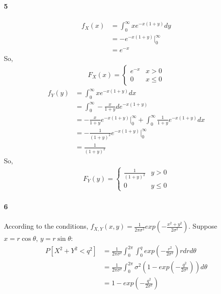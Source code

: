 \documentclass[22pt]{article}
\begin{document}
    \paragraph{5}
    \begin{align}
    f_X(x) & = \int_{0}^{\infty} xe^{-x(1+y)}dy\\
    &  = -e^{-x(1+y)}|_0^{\infty}\\
    & = e^{-x}
    \end{align}
    So,\begin{align}
    F_X(x) = 
				\begin{cases}
				e^{-x} & x >0 \\
				0 & x \leq 0 
				\end{cases}
	\end{align}
    \begin{align}
    f_Y(y) & = \int_{0}^{\infty} xe^{-x(1+y)}dx\\
    & = \int_{0}^{\infty} -\frac{x}{1+y} de^{-x(1+y)}\\
    & = -\frac{x}{1+y} e^{-x(1+y)}|_0^{\infty} + \int_{0}^{\infty}\frac{1}{1+y} e^{-x(1+y)} dx\\
    & = -\frac{1}{(1+y)^2}e^{-x(1+y)}|_0^{\infty} \\
    & = \frac{1}{(1+y)^2}
    \end{align}
    So,\begin{align}
    F_Y(y) = 
				\begin{cases}
				\frac{1}{(1+y)^2} & y > 0\\
				0 & y \leq 0
				\end{cases}
	\end{align}


    \paragraph{6}
    According to the conditions, $f_{X,Y}(x,y) = \frac{1}{2 \pi	\sigma^2}exp(-\frac{x^2+y^2}{2 \sigma^2}) $. 
    Suppose $x = r\cos \theta$, $y = r\sin \theta$:
    \begin{align}
    P[X^2 + Y^2 <q^2] & = \frac{1}{2 \pi	\sigma^2} \int_{0}^{2 \pi}\int_{0}^{q}exp(-\frac{r^2}{2 \sigma^2}) rdrd \theta\\
    & = 	\frac{1}{2 \pi	\sigma^2} \int_{0}^{2 \pi} \sigma^2 (1 - exp(-\frac{q^2}{2 \sigma^2})) d \theta	\\
    & = 1 - exp(-\frac{q^2}{2 \sigma^2})
    \end{align}
\end{document}
